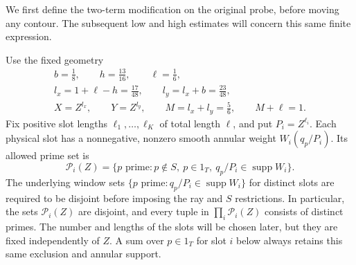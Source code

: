 \documentclass[11pt,a4paper]{article}
\numberwithin{equation}{section}
\numberwithin{figure}{section}
\theoremstyle{definition}
\theoremstyle{remark}
\begin{document}
We first define the two-term modification on the original probe, before
moving any contour.  The subsequent low and high estimates will concern
this same finite expression.

Use the fixed geometry
\begin{equation}
 \begin{gathered}
 b=\frac18,\qquad h=\frac{13}{16},\qquad \ell=\frac16,\\
 l_x=1+\ell-h=\frac{17}{48},\qquad
 l_y=l_x+b=\frac{23}{48},\\
 X=Z^{l_x},\qquad Y=Z^{l_y},\qquad
 M=l_x+l_y=\frac56,\qquad M+\ell=1.
 \end{gathered}
 \label{old-eq:5.1}
\end{equation}
Fix positive slot lengths $\ell_1,\ldots,\ell_K$ of total length
$\ell$, and put $P_i=Z^{\ell_i}$.  Each physical slot has a
nonnegative, nonzero smooth annular weight $W_i(q_p/P_i)$.  Its allowed
prime set is
\[
 \mathcal P_i(Z)=\{p\text{ prime}:p\notin S,\ p\in1_T,
                         \ q_p/P_i\in\operatorname{supp}W_i\}.
\]
The underlying window sets
$\{p\text{ prime}:q_p/P_i\in\operatorname{supp}W_i\}$ for distinct slots
are required to be disjoint before imposing the ray and $S$ restrictions.
In particular, the sets $\mathcal P_i(Z)$ are disjoint, and every tuple in
$\prod_i\mathcal P_i(Z)$ consists of distinct primes.
The number and lengths of the slots will be chosen later, but they are
fixed independently of $Z$.  A sum over $p\in1_T$ for slot $i$ below
always retains this same exclusion and annular support.
\end{document}
